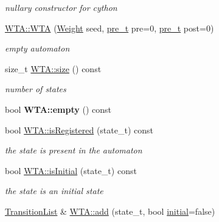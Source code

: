 \begin{DoxyCompactItemize}
\begin{DoxyCompactList}\small\item\em nullary constructor for cython \end{DoxyCompactList}\item 
\mbox{\label{group__schemata_ga6eeb789b8c8aa8404f611a6fed61faca}} 
\mbox{\hyperlink{group__schemata_ga6eeb789b8c8aa8404f611a6fed61faca}{W\+T\+A\+::\+W\+TA}} (\mbox{\hyperlink{classWeight}{Weight}} seed, \mbox{\hyperlink{group__general_ga092fe8b972dfa977c2a0886720a7731e}{pre\+\_\+t}} pre=0, \mbox{\hyperlink{group__general_ga092fe8b972dfa977c2a0886720a7731e}{pre\+\_\+t}} post=0)
\begin{DoxyCompactList}\small\item\em empty automaton \end{DoxyCompactList}\item 
\mbox{\label{group__schemata_gab201fee50d73843159cbef5f453838f0}} 
size\+\_\+t \mbox{\hyperlink{group__schemata_gab201fee50d73843159cbef5f453838f0}{W\+T\+A\+::size}} () const
\begin{DoxyCompactList}\small\item\em number of states \end{DoxyCompactList}\item 
\mbox{\label{group__schemata_gada977ff7270308f29852b59f38965bde}} 
bool {\bfseries W\+T\+A\+::empty} () const
\item 
\mbox{\label{group__schemata_ga4459bd6654cbe35b39df9cade16c6d58}} 
bool \mbox{\hyperlink{group__schemata_ga4459bd6654cbe35b39df9cade16c6d58}{W\+T\+A\+::is\+Registered}} (state\+\_\+t) const
\begin{DoxyCompactList}\small\item\em the state is present in the automaton \end{DoxyCompactList}\item 
bool \mbox{\hyperlink{group__schemata_ga88d07a1e47cc3ee537234861b7336dd6}{W\+T\+A\+::is\+Initial}} (state\+\_\+t) const
\begin{DoxyCompactList}\small\item\em the state is an initial state \end{DoxyCompactList}\item 
\mbox{\hyperlink{classTransitionList}{Transition\+List}} \& \mbox{\hyperlink{group__schemata_ga924a1c533383a7185b9d466b59c5a495}{W\+T\+A\+::add}} (state\+\_\+t, bool \mbox{\hyperlink{classWTA_ae6b10f70925f14f36b839e5d8657bc5e}{initial}}=false)

\end{DoxyCompactItemize}
